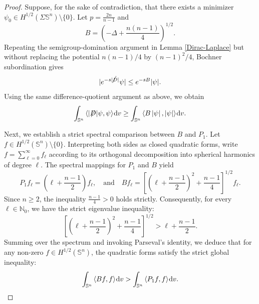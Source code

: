\documentclass[a4paper, 12pt]{article}
\def\slashiii#1{\setbox0=\hbox{$#1$}#1\hskip-\wd0\hbox to\wd0{\hss\sl/\/\hss}}
\begin{document}
\begin{proof}
	Suppose, for the sake of contradiction, that there exists a minimizer $\psi_0 \in H^{1/2}(\Sigma \mathbb{S}^n) \setminus \{0\}$. Let $p = \frac{2n}{n-1}$ and 
	\[
	B = \left(-\Delta + \frac{n(n-1)}{4}\right)^{1/2}.
	\]
	Repeating the semigroup-domination argument in Lemma \ref{Dirac-Laplace} but without
	replacing the potential \(n(n-1)/4\) by \((n-1)^2/4\), Bochner subordination gives
	\[
	|e^{-s|\slashiii{D}|}\psi|
	\le
	e^{-sB}|\psi|.
	\]
	Using the same difference-quotient argument as above, we obtain
	\begin{equation}\label{eq:form_domination}
		\int_{{\mathbb{S}^n}} {\left\langle {|\slashiii{D}|\psi ,\psi } \right\rangle } {\mkern 1mu} {\text{d}}v \geq \int_{{\mathbb{S}^n}} {\left\langle {B\left| \psi  \right|,\left| \psi  \right|} \right\rangle } {\mkern 1mu} {\text{d}}v.
	\end{equation}
	
	Next, we establish a strict spectral comparison between $B$ and $P_1$. Let \(f\in H^{1/2}(\mathbb S^n)\setminus\{0\}\). Interpreting both sides as
	closed quadratic forms, write \(f=\sum_{\ell=0}^\infty f_\ell\) according to its orthogonal decomposition into spherical harmonics of degree $\ell$. The spectral mappings for $P_1$ and $B$ yield
	\[
	P_1 f_\ell = \left(\ell + \frac{n-1}{2}\right) f_\ell, \quad \text{and} \quad B f_\ell = \left[ \left(\ell + \frac{n-1}{2}\right)^2 + \frac{n-1}{4} \right]^{1/2} f_\ell.
	\]
	Since $n \ge 2$, the inequality $\frac{n-1}{4} > 0$ holds strictly. Consequently, for every $\ell \in \mathbb{N}_0$, we have the strict eigenvalue inequality:
	\[
	\left[ \left(\ell + \frac{n-1}{2}\right)^2 + \frac{n-1}{4} \right]^{1/2} > \ell + \frac{n-1}{2}.
	\]
	Summing over the spectrum and invoking Parseval's identity, we deduce that for any non-zero $f \in H^{1/2}(\mathbb{S}^n)$, the quadratic forms satisfy the strict global inequality:
	\begin{equation}\label{eq:strict_operator_comparison}
		\int_{{\mathbb{S}^n}} {\left\langle {Bf,f} \right\rangle } {\mkern 1mu} {\text{d}}v > \int_{{\mathbb{S}^n}} {\left\langle {P_1 f,f} \right\rangle } {\mkern 1mu} {\text{d}}v.
	\end{equation}
	

\end{proof}
\end{document}
